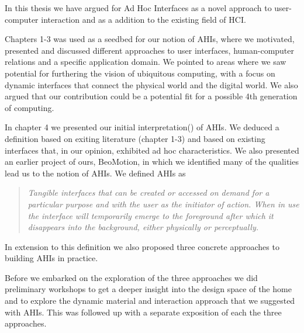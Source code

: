 
In this thesis we have argued for Ad Hoc Interfaces as a novel approach to user-computer interaction and as a addition to the existing field of HCI. 

Chapters 1-3 was used as a seedbed for our notion of AHIs, where we motivated, presented and discussed different approaches to user interfaces, human-computer relations and a specific application domain.
We pointed to areas where we saw potential for furthering the vision of ubiquitous computing, with a focus on dynamic interfaces that connect the physical world and the digital world.
We also argued that our contribution could be a potential fit for a possible 4th generation of computing.  

In chapter 4 we presented our initial interpretation() of AHIs.
We deduced a definition based on exiting literature (chapter 1-3) and based on existing interfaces that, in our opinion, exhibited ad hoc characteristics.
We also presented an earlier project of ours, BeoMotion, in which we identified many of the qualities lead us to the notion of AHIs.
We defined AHIs as 

\begin{quotation}
\emph{Tangible interfaces that can be created or accessed on demand for a particular purpose and with the user as the initiator of action. When in use the interface will temporarily emerge to the foreground after which it disappears into the background, either physically or perceptually.}
\end{quotation}
In extension to this definition we also proposed three concrete approaches to building AHIs in practice.

Before we embarked on the exploration of the three approaches we did preliminary workshops to get a deeper insight into the design space of the home and to explore the dynamic material and interaction approach that we suggested with AHIs.
This was followed up with a separate exposition of each the three approaches.

